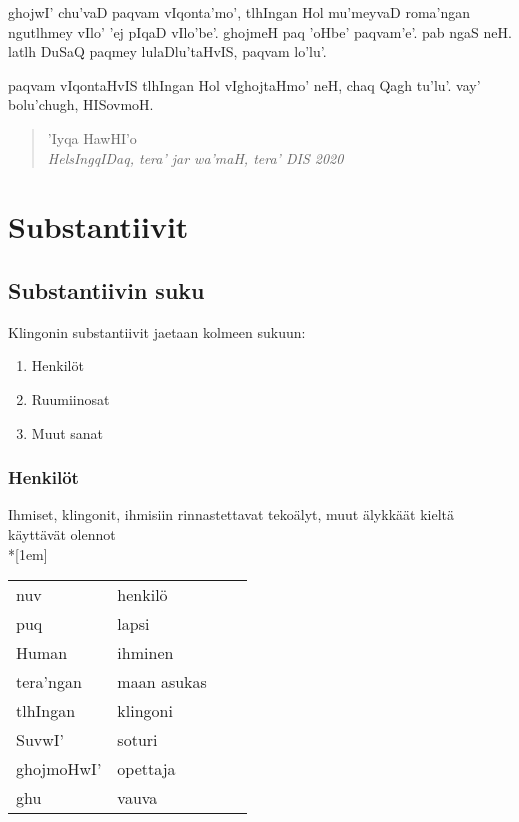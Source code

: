 \documentclass{book}
\begin{document}
ghojwI' chu'vaD paqvam vIqonta'mo', tlhIngan Hol mu'meyvaD roma'ngan ngutlhmey vIlo' 'ej pIqaD vIlo'be'.
ghojmeH paq 'oHbe' paqvam'e'. pab ngaS neH. latlh DuSaQ paqmey lulaDlu'taHvIS, paqvam lo'lu'.

paqvam vIqontaHvIS tlhIngan Hol vIghojtaHmo' neH, chaq Qagh tu'lu'.
vay' bolu'chugh, HISovmoH.

\begin{quote}
    'Iyqa HawHI'o \\
    \textit{HelsIngqIDaq, tera' jar wa'maH, tera' DIS 2020}
\end{quote}

\tableofcontents

\mainmatter

\chapter{Substantiivit}

\section{Substantiivin suku}

Klingonin substantiivit jaetaan kolmeen sukuun:

\begin{enumerate}
\item Henkilöt
\item Ruumiinosat
\item Muut sanat
\end{enumerate}

\subsection{Henkilöt}

Ihmiset, klingonit, ihmisiin rinnastettavat tekoälyt, muut älykkäät kieltä käyttävät olennot\\*[1em]
\begin{tabular}{Bl Il}
nuv & henkilö \\
puq & lapsi \\
Human & ihminen \\
tera'ngan & maan asukas \\
tlhIngan & klingoni \\
SuvwI' & soturi \\
ghojmoHwI' & opettaja \\
ghu & vauva \\
\end{tabular}
\end{document}

